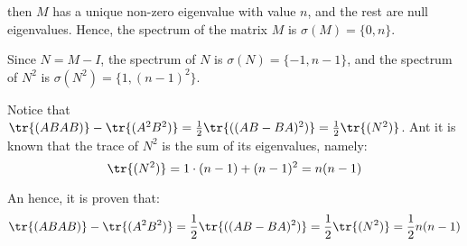 \documentclass[../../main.tex]{subfiles}
\begin{document}
  then $M$ has a unique non-zero eigenvalue with value $n$, and the rest are null eigenvalues. Hence, the spectrum of the matrix $M$ is $\sigma(M) = \{0, n\}$.

  Since $N = M - I$, the spectrum of $N$ is $\sigma(N) = \{-1, n - 1\}$, and the spectrum of $N^2$ is $\sigma(N^2) = \{1, (n - 1)^2\}$.

  Notice that $\tr{(ABAB)} - \tr{(A^2 B^2)} = \frac{1}{2}\tr{((AB - BA)^2)} = \frac{1}{2}\tr{(N^2)}$. Ant it is known that the trace of $N^2$ is the sum of its eigenvalues, namely:
  $$
  \tr{(N^2)} = 1 \cdot (n - 1) + (n - 1)^2 = n (n - 1)
  $$

  An hence, it is proven that:
  $$
  \tr{(ABAB)} - \tr{(A^2 B^2)} = \frac{1}{2}\tr{((AB - BA)^2)} = \frac{1}{2}\tr{(N^2)} = \frac{1}{2} n (n - 1)
  $$
\end{document}
